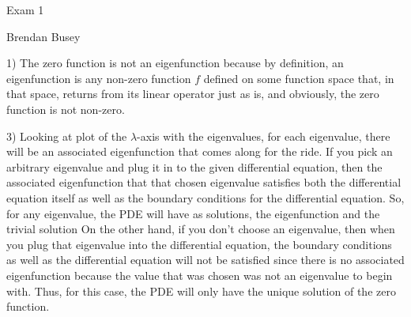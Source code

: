 \documentclass[executivepaper]{article}
\begin{document}
\vspace*{-40mm}

\begin{center}

Exam 1

\end{center}

\begin{flushright}

Brendan Busey

\end{flushright}

\begin{flushleft}

1) The zero function is not an eigenfunction because by definition, an eigenfunction is any non-zero function $f$ defined on some function space that, in that space, returns from its linear operator just as is, and obviously, the zero function is not non-zero.

\end{flushleft}

\begin{flushleft}

3) Looking at plot of the $\lambda$-axis with the eigenvalues, for each eigenvalue, there will be an associated eigenfunction that comes along for the ride. If you pick an arbitrary eigenvalue and plug it in to the given differential equation, then the associated eigenfunction that that chosen eigenvalue satisfies both the differential equation itself as well as the boundary conditions for the differential equation. So, for any eigenvalue, the PDE will have as solutions, the eigenfunction and the trivial solution On the other hand, if you don't choose an eigenvalue, then when you plug that eigenvalue into the differential equation, the boundary conditions as well as the differential equation will not be satisfied since there is no associated eigenfunction because the value that was chosen was not an eigenvalue to begin with. Thus, for this case, the PDE will only have the unique solution of the zero function.

\end{flushleft}
\end{document}
